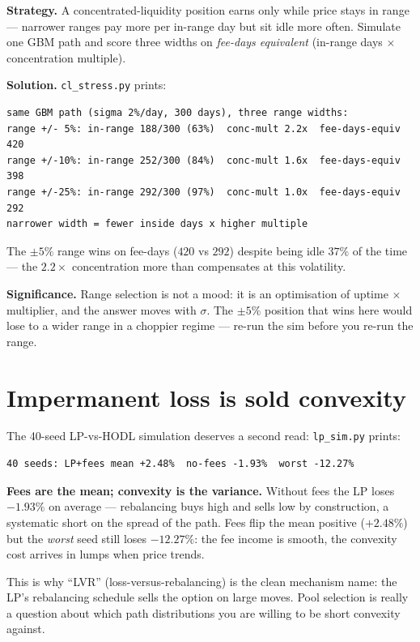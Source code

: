 \begin{example}\label{ex:cluptime}
\textbf{Strategy.} A concentrated-liquidity position earns only
while price stays in range --- narrower ranges pay more per
in-range day but sit idle more often. Simulate one GBM path and
score three widths on \emph{fee-days equivalent}
(in-range days $\times$ concentration multiple).

\textbf{Solution.} \texttt{cl\_stress.py} prints:
\begin{verbatim}
same GBM path (sigma 2%/day, 300 days), three range widths:
range +/- 5%: in-range 188/300 (63%)  conc-mult 2.2x  fee-days-equiv 420
range +/-10%: in-range 252/300 (84%)  conc-mult 1.6x  fee-days-equiv 398
range +/-25%: in-range 292/300 (97%)  conc-mult 1.0x  fee-days-equiv 292
narrower width = fewer inside days x higher multiple
\end{verbatim}
The $\pm5\%$ range wins on fee-days ($420$ vs $292$) despite
being idle $37\%$ of the time --- the $2.2\times$ concentration
more than compensates at this volatility.

\textbf{Significance.} Range selection is not a mood: it is an
optimisation of uptime $\times$ multiplier, and the answer moves
with $\sigma$. The $\pm5\%$ position that wins here would lose to
a wider range in a choppier regime --- re-run the sim before you
re-run the range.
\end{example}


\section{Impermanent loss is sold convexity}\label{sec:lvr}
The 40-seed LP-vs-HODL simulation deserves a second read:
\texttt{lp\_sim.py} prints:
\begin{verbatim}
40 seeds: LP+fees mean +2.48%  no-fees -1.93%  worst -12.27%
\end{verbatim}
\begin{example}\label{ex:lvr}
\textbf{Fees are the mean; convexity is the variance.} Without
fees the LP loses $-1.93\%$ on average --- rebalancing buys
high and sells low by construction, a systematic short on the
spread of the path. Fees flip the mean positive ($+2.48\%$)
but the \emph{worst} seed still loses $-12.27\%$: the fee income
is smooth, the convexity cost arrives in lumps when price
trends.
\begin{solution}
This is why ``LVR'' (loss-versus-rebalancing) is the clean
mechanism name: the LP's rebalancing schedule sells the option
on large moves. Pool selection is really a question about which
path distributions you are willing to be short convexity
against.
\end{solution}
\end{example}
